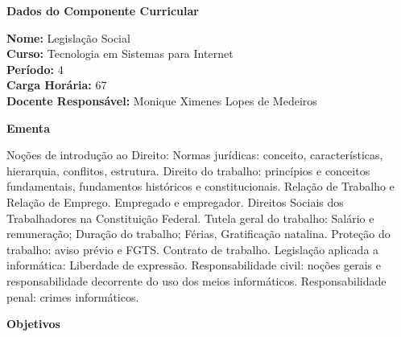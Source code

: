 

\begin{snugshade}\begin{center}\textbf{
    Dados do Componente Curricular
}\end{center}\end{snugshade}

\noindent \textbf{Nome:}                Legislação Social
\\        \textbf{Curso:}               Tecnologia em Sistemas para Internet
\\        \textbf{Período:}             \unit{4}{\degree}
\\        \textbf{Carga Horária:}       \unit{67}{\hour}
\\        \textbf{Docente Responsável:} Monique Ximenes Lopes de Medeiros


\begin{snugshade}\begin{center}\textbf{
    Ementa
\vphantom{q}}\end{center}\end{snugshade}

\noindent
Noções de introdução ao Direito: Normas jurídicas: conceito, características, hierarquia, conflitos, estrutura. Direito do trabalho: princípios e conceitos fundamentais, fundamentos históricos e constitucionais. Relação de Trabalho e Relação de Emprego. Empregado e empregador. Direitos Sociais dos Trabalhadores na Constituição Federal. Tutela geral do trabalho: Salário e remuneração; Duração do trabalho; Férias, Gratificação natalina. Proteção do trabalho: aviso prévio e FGTS. Contrato de trabalho. Legislação aplicada a informática: Liberdade de expressão. Responsabilidade civil: noções gerais e responsabilidade decorrente do uso dos meios informáticos. Responsabilidade penal: crimes informáticos. 


\begin{snugshade}\begin{center}\textbf{
    Objetivos
}\end{center}\end{snugshade}

